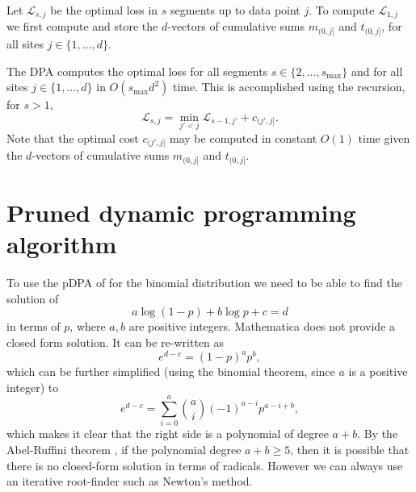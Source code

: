 \documentclass[12pt]{article}
\begin{document}
Let $\mathcal L_{s,j}$ be the optimal loss in $s$ segments up to data
point $j$. To compute $\mathcal L_{1, j}$ we first compute and store
the $d$-vectors of cumulative sums $m_{(0, j]}$ and $t_{(0, j]}$, for
all sites $j\in\{1, \dots, d\}$.

The DPA computes the optimal loss for all segments $s\in\{2, \dots,
s_{\text{max}} \}$ and for all sites $j\in\{1, \dots, d\}$ in
$O(s_{\text{max}} d^2)$ time. This is accomplished using the
recursion, for $s>1$,
\begin{equation}
  \label{eq:dpa-recursion}
  \mathcal L_{s, j} = 
  \min_{j' < j}
  \mathcal L_{s-1, j'}
  + 
  c_{(j', j]}.
\end{equation}
Note that the optimal cost $c_{(j', j]}$ may be computed in constant
$O(1)$ time given the $d$-vectors of cumulative sums $m_{(0, j]}$ and
$t_{(0, j]}$.

\section{Pruned dynamic programming algorithm}

To use the pDPA of \citet{pruned-dp} for the binomial distribution we
need to be able to find the solution of
\begin{equation}
  \label{eq:pDPA-intervals}
  a \log(1-p) + b \log p + c = d
\end{equation}
in terms of $p$, where $a,b$ are positive integers. Mathematica does
not provide a closed form solution. It can be re-written as
\begin{equation}
  \label{eq:pDPA-interval-factorized}
  e^{d-c} = (1-p)^a p^b,
\end{equation}
which can be further simplified (using the binomial theorem, since $a$
is a positive integer) to
\begin{equation}
  \label{eq:pDPA-interval-polynomial}
  e^{d-c} = \sum_{i=0}^a \binom{a}{i} (-1)^{a-i} p^{a-i+b},
\end{equation}
which makes it clear that the right side is a polynomial of degree
$a+b$. By the Abel-Ruffini theorem \citep{Abel-Ruffini-wikipedia}, if
the polynomial degree $a+b\geq 5$, then it is possible that there is
no closed-form solution in terms of radicals. However we can always
use an iterative root-finder such as Newton's method.




\end{document}
